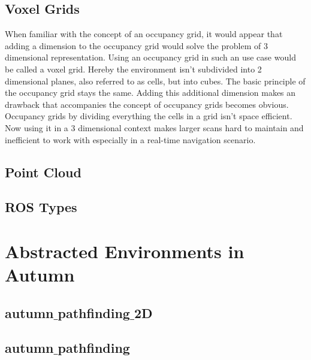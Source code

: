 \subsection{Voxel Grids}

When familiar with the concept of an occupancy grid, it would appear that adding a dimension to the occupancy grid would solve the problem of 3 dimensional representation. \newline
Using an occupancy grid in such an use case would be called a voxel grid. Hereby the environment isn't subdivided into 2 dimensional planes, also referred to as cells, but into cubes. The basic principle of the occupancy grid stays the same. Adding this additional dimension makes an drawback that accompanies the concept of occupancy grids becomes obvious. Occupancy grids by dividing everything the cells in a grid isn't space efficient. Now using it in a 3 dimensional context makes larger scans hard to maintain and inefficient to work with especially in a real-time navigation scenario.  

\subsection{Point Cloud}

\subsection{ROS Types}

\section{Abstracted Environments in Autumn}

\subsection{autumn$\_$pathfinding$\_$2D}

\subsection{autumn$\_$pathfinding}